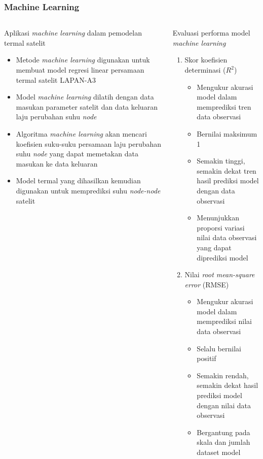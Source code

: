 \documentclass[8pt]{beamer}
\begin{document}
\begin{frame}
  \frametitle{Machine Learning}
  \begin{columns}[T]
    \begin{block}{\center Aplikasi \textit{machine learning} dalam pemodelan termal satelit}
      \begin{itemize}
        \item Metode \textit{machine learning} digunakan untuk membuat model regresi linear persamaan termal satelit LAPAN-A3
        \item Model \textit{machine learning} dilatih dengan data masukan parameter satelit dan data keluaran laju perubahan suhu \textit{node}
        \item Algoritma \textit{machine learning} akan mencari koefisien suku-suku persamaan laju perubahan suhu \textit{node} yang dapat memetakan data masukan ke data keluaran
        \item Model termal yang dihasilkan kemudian digunakan untuk memprediksi suhu \textit{node-node} satelit
      \end{itemize}
    \end{block}
    \begin{block}{\center Evaluasi performa model \\ \textit{machine learning}}
      \begin{enumerate}
        \item Skor koefisien determinasi ($R^2$) \cite{gupta2021}
          \begin{itemize}
            \item Mengukur akurasi model dalam memprediksi tren data observasi
            \item Bernilai maksimum 1
            \item Semakin tinggi, semakin dekat tren hasil prediksi model dengan data observasi
            \item Menunjukkan proporsi variasi nilai data observasi yang dapat diprediksi model
          \end{itemize}
        \item Nilai \textit{root mean-square error} (RMSE) \cite{zheng}
          \begin{itemize}
            \item Mengukur akurasi model dalam memprediksi nilai data observasi
            \item Selalu bernilai positif
            \item Semakin rendah, semakin dekat hasil prediksi model dengan nilai data observasi
            \item Bergantung pada skala dan jumlah dataset model
          \end{itemize}
        \end{enumerate}
    \end{block}
  \end{columns}
\end{frame}
\end{document}
